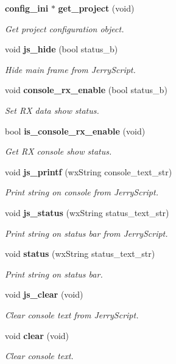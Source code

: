 \begin{DoxyCompactItemize}
\textbf{ config\+\_\+ini} $\ast$ \textbf{ get\+\_\+project} (void)
\begin{DoxyCompactList}\small\item\em Get project configuration object. \end{DoxyCompactList}\item 
void \textbf{ js\+\_\+hide} (bool status\+\_\+b)
\begin{DoxyCompactList}\small\item\em Hide main frame from Jerry\+Script. \end{DoxyCompactList}\item 
void \textbf{ console\+\_\+rx\+\_\+enable} (bool status\+\_\+b)
\begin{DoxyCompactList}\small\item\em Set RX data show status. \end{DoxyCompactList}\item 
bool \textbf{ is\+\_\+console\+\_\+rx\+\_\+enable} (void)
\begin{DoxyCompactList}\small\item\em Get RX console show status. \end{DoxyCompactList}\item 
void \textbf{ js\+\_\+printf} (wx\+String console\+\_\+text\+\_\+str)
\begin{DoxyCompactList}\small\item\em Print string on console from Jerry\+Script. \end{DoxyCompactList}\item 
void \textbf{ js\+\_\+status} (wx\+String status\+\_\+text\+\_\+str)
\begin{DoxyCompactList}\small\item\em Print string on status bar from Jerry\+Script. \end{DoxyCompactList}\item 
void \textbf{ status} (wx\+String status\+\_\+text\+\_\+str)
\begin{DoxyCompactList}\small\item\em Print string on status bar. \end{DoxyCompactList}\item 
void \textbf{ js\+\_\+clear} (void)
\begin{DoxyCompactList}\small\item\em Clear console text from Jerry\+Script. \end{DoxyCompactList}\item 
void \textbf{ clear} (void)
\begin{DoxyCompactList}\small\item\em Clear console text. \end{DoxyCompactList}\item 

\end{DoxyCompactItemize}
